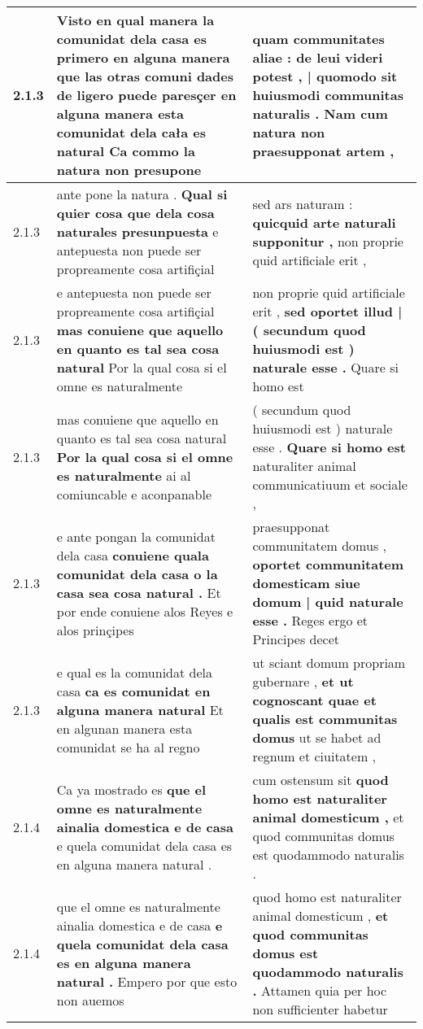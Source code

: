 \begin{tabular}{|p{1cm}|p{6.5cm}|p{6.5cm}|}
2.1.3 & Visto en qual manera la comunidat dela casa es primero en alguna manera que las otras comuni dades de ligero puede paresçer \textbf{ en alguna manera esta comunidat dela cała es natural } Ca commo la natura non presupone & quam communitates aliae : \textbf{ de leui videri potest , | quomodo sit huiusmodi communitas naturalis . } Nam cum natura non praesupponat artem , \\\hline
2.1.3 & ante pone la natura . \textbf{ Qual si quier cosa que dela cosa naturales presunpuesta } e antepuesta non puede ser propreamente cosa artifiçial & sed ars naturam : \textbf{ quicquid arte naturali supponitur , } non proprie quid artificiale erit , \\\hline
2.1.3 & e antepuesta non puede ser propreamente cosa artifiçial \textbf{ mas conuiene que aquello en quanto es tal sea cosa natural } Por la qual cosa si el omne es naturalmente & non proprie quid artificiale erit , \textbf{ sed oportet illud | ( secundum quod huiusmodi est ) naturale esse . } Quare si homo est \\\hline
2.1.3 & mas conuiene que aquello en quanto es tal sea cosa natural \textbf{ Por la qual cosa si el omne es naturalmente } ai al comiuncable e aconpanable & ( secundum quod huiusmodi est ) naturale esse . \textbf{ Quare si homo est } naturaliter animal communicatiuum et sociale , \\\hline
2.1.3 & e ante pongan la comunidat dela casa \textbf{ conuiene quala comunidat dela casa o la casa sea cosa natural . } Et por ende conuiene alos Reyes e alos prinçipes & praesupponat communitatem domus , \textbf{ oportet communitatem domesticam siue domum | quid naturale esse . } Reges ergo et Principes decet \\\hline
2.1.3 & e qual es la comunidat dela casa \textbf{ ca es comunidat en alguna manera natural } Et en algunan manera esta comunidat se ha al regno & ut sciant domum propriam gubernare , \textbf{ et ut cognoscant quae et qualis est communitas domus } ut se habet ad regnum et ciuitatem , \\\hline
2.1.4 & Ca ya mostrado es \textbf{ que el omne es naturalmente ainalia domestica e de casa } e quela comunidat dela casa es en alguna manera natural . & cum ostensum sit \textbf{ quod homo est naturaliter animal domesticum , } et quod communitas domus est quodammodo naturalis . \\\hline
2.1.4 & que el omne es naturalmente ainalia domestica e de casa \textbf{ e quela comunidat dela casa es en alguna manera natural . } Empero por que esto non auemos & quod homo est naturaliter animal domesticum , \textbf{ et quod communitas domus est quodammodo naturalis . } Attamen quia per hoc non sufficienter habetur \\\hline

\end{tabular}
